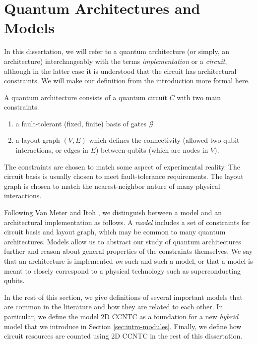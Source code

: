 \section{Quantum Architectures and Models}
\label{sec:intro-arch}

In this dissertation, we will refer to a quantum architecture (or simply,
an architecture) interchangeably with the terms \emph{implementation} 
or a \emph{circuit}, although in the latter case it is understood that the
circuit has architectural constraints. We will make our definition from
the introduction more formal here.

\begin{definition}
A quantum architecture consists of a quantum circuit $C$ with
two main constraints.

\begin{enumerate}
\item a fault-tolerant (fixed, finite) basis of
gates $\mathcal{G}$
\item a layout graph $(V,E)$ which defines the connectivity (allowed two-qubit
interactions, or edges in $E$) between qubits (which are nodes in $V$).
\end{enumerate}
\end{definition}

The constraints are chosen to match some aspect of experimental reality.
The circuit basis is usually chosen to meet fault-tolerance requirements.
The layout graph is chosen to match the nearest-neighbor nature of
many physical interactions.

Following Van Meter and Itoh \cite{VanMeter2005},
we distinguish between a model and an architectural implementation as follows.
A \emph{model} includes a set of constraints for circuit basis and layout
graph, which may be common to many quantum architectures. Models allow us
to abstract our study of quantum architectures further and reason about
general properties of the constraints themselves.
We say that an architecture is implemented \emph{on} such-and-such a model,
or that a model is meant to closely correspond to a physical technology such as
superconducting qubits.

In the rest of this section, we give definitions of
several important models that are common in the literature and how they are
related to each other.
In particular, we define the
model \textsf{2D CCNTC} as a foundation for a new \emph{hybrid}
model that we
introduce in Section \ref{sec:intro-modules}. Finally, we define how
circuit resources are counted using \textsf{2D CCNTC} in the rest of this
dissertation.

